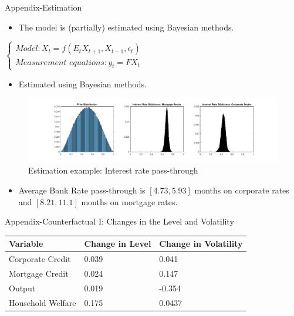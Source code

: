 \documentclass[8pt,aspectratio=169]{beamer}
\numberwithin{equation}{section}
\begin{document}
\begin{frame}{Appendix-Estimation}

\begin{itemize}
\item The model is (partially) estimated using Bayesian methods. 
\end{itemize}
$
\begin{cases}
 \textit{Model}: X_t = f(E_tX_{t+1},X_{t-1},\epsilon_t)   \\
 \textit{Measurement equations}: y_t = F X_t
\end{cases}
$

\vspace{5 mm}


\begin{itemize}
\item Estimated using Bayesian methods. 


\end{itemize}

\begin{figure}[H]
\centering
\caption{{Estimation example:  Interest rate pass-through}}
\includegraphics[scale=0.4]{posteriordistributions_calvo2.pdf}
\end{figure}


\begin{itemize}
\item Average Bank Rate pass-through is $[4.73,5.93]$ months on corporate rates and $[8.21,11.1]$ months on mortgage rates.

\end{itemize}

\end{frame}




\begin{frame}{Appendix-Counterfactual I: Changes in the Level and Volatility}

\begin{table}[h]

\begin{tabular}{l|l|l}
Variable &  Change in Level &  Change in Volatility \\
\hline
\hline
    Corporate Credit           &       0.039    &      0.041 \\
    Mortgage Credit            &      0.024    &       0.147 \\
    Output         &     0.019    &    -0.354 \\ 
    Household Welfare       &     0.175     &     0.0437\\
\end{tabular}
\end{table}


\end{frame}
\end{document}
